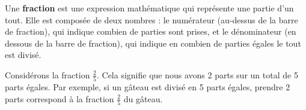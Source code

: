 \documentclass{article}
\begin{document}
\begin{tcolorbox}[colback=cyan!10!white, colframe=red!75!black, title=\textcolor{white}{Définition}, 
                  sharp corners=southwest]
    Une \textbf{fraction} est une expression mathématique qui représente une partie d'un tout. Elle est composée de deux nombres : le numérateur (au-dessus de la barre de fraction), qui indique combien de parties sont prises, et le dénominateur (en dessous de la barre de fraction), qui indique en combien de parties égales le tout est divisé.
\end{tcolorbox}

\vspace{0.2cm}

\begin{tcolorbox}[colback=orange!10!white, colframe=orange!75!black, sharp corners=south, boxrule=0.8mm, title=\textcolor{white}{Exemple}]
    Considérons la fraction \(\frac{2}{5}\). Cela signifie que nous avons 2 parts sur un total de 5 parts égales. Par exemple, si un gâteau est divisé en 5 parts égales, prendre 2 parts correspond à la fraction \(\frac{2}{5}\) du gâteau.

    \vspace{10pt}
    \centering
\end{tcolorbox}

\vspace{0.2cm}
\end{document}
